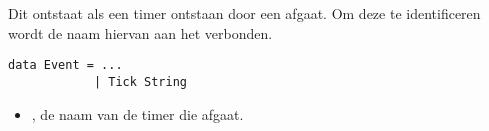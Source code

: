 Dit  ontstaat als een timer ontstaan door een  afgaat. Om deze te identificeren wordt de naam hiervan aan het  verbonden.
\begin{lstlisting}
data Event = ...
			| Tick String
\end{lstlisting}
\begin{itemize}
	\item {}, de naam van de timer die afgaat.
\end{itemize}















